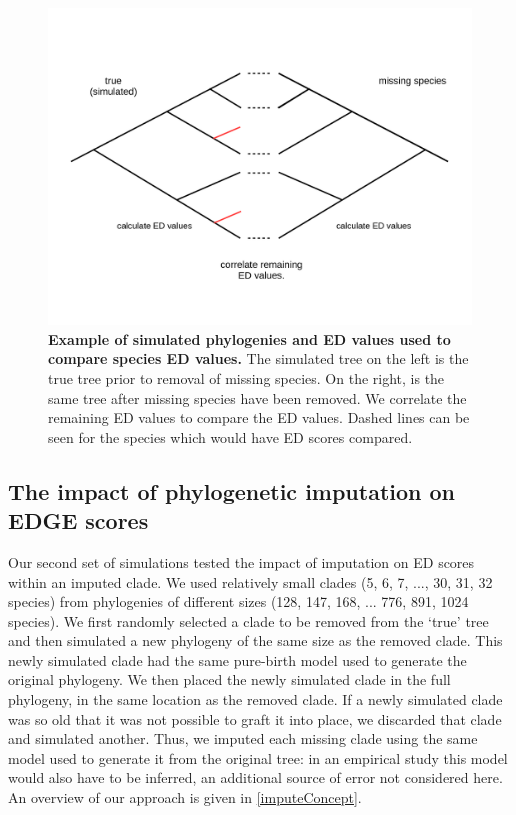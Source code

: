 \documentclass[12pt,english]{article}
\begin{document}
\begin{figure}[!ht]
  \center
  \includegraphics[width=.75\textwidth]{missingSpecies.png}
  \caption{\textbf{Example of simulated phylogenies and ED values used to
  compare species ED values.} The simulated tree on the left is the true tree
  prior to removal of missing species. On the right, is the same tree after
  missing species have been removed. We correlate the remaining ED values to
  compare the ED values. Dashed lines can be seen for the species which would
  have ED scores compared.}
  \label{missingSpecies}
\end{figure}

\subsection*{The impact of phylogenetic imputation on EDGE scores}
Our second set of simulations tested the impact of imputation on ED scores
within an imputed clade. We used relatively small clades (5, 6, 7, ..., 30, 31,
32 species) from phylogenies of different sizes (128, 147, 168, ... 776, 891,
1024 species). We first randomly selected a clade to be removed from the ‘true’
tree and then simulated a new phylogeny of the same size as the removed clade.
This newly simulated clade had the same pure-birth model used to generate the
original phylogeny. We then placed the newly simulated clade in the full
phylogeny, in the same location as the removed clade. If a newly simulated clade
was so old that it was not possible to graft it into place, we discarded that
clade and simulated another. Thus, we imputed each missing clade using the same
model used to generate it from the original tree: in an empirical study this
model would also have to be inferred, an additional source of error not
considered here. An overview of our approach is given in \ref{imputeConcept}. 
\end{document}
